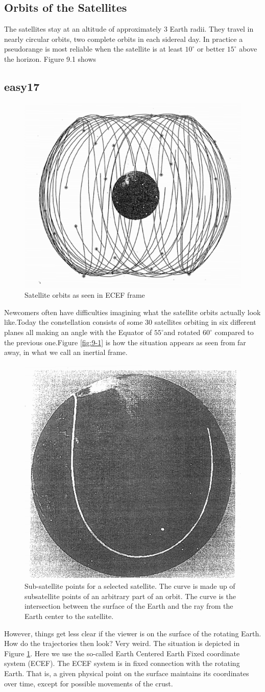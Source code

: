 	\subsection{Orbits of the Satellites}
	The satellites stay at an altitude of approximately 3 Earth radii.  They travel in nearly circular orbits, two complete orbits in each sidereal day. In practice a pseudorange is most reliable when the satellite is at least $10^\circ$ or better $15^\circ$ above the horizon. Figure 9.1 shows

	\subsection{easy17}\label{subsec:easy17}
	\begin{figure}
		\centering
		\includegraphics[width=0.4\linewidth]{TeX_files/Part03/chapter09/image/9-2}
		\caption{Satellite orbits as seen in ECEF frame}
		\label{fig:9-2}
	\end{figure}
	Newcomers often have difficulties imagining what the satellite orbits actually look like.Today the constellation consists of some 30 satellites orbiting in six different planes all	making an angle with the Equator of $55^\circ$and rotated $60^\circ$ compared to the previous one.Figure \ref{fig:9-1} is how the situation appears as seen from far away, in what we call an inertial
	frame.
	\begin{figure}
		\centering
		\includegraphics[width=0.4\linewidth]{TeX_files/Part03/chapter09/image/9-3}
		\caption{Sub-satellite points for a selected satellite. The curve is made up of subsatellite points of an arbitrary part of an orbit. The curve is the intersection between the surface of the Earth and the ray from the Earth center to the satellite.}
		\label{fig:9-3}
	\end{figure}
	However, things get less clear if the viewer is on the surface of the rotating Earth. How do the trajectories then look? Very weird. The situation is depicted in Figure \ref{fig:9-2}. Here we use the so-called Earth Centered Earth Fixed coordinate system (ECEF). The ECEF system is in fixed connection with the rotating Earth. That is, a given physical point on the surface maintains its coordinates over time, except for possible movements of the crust.
	
